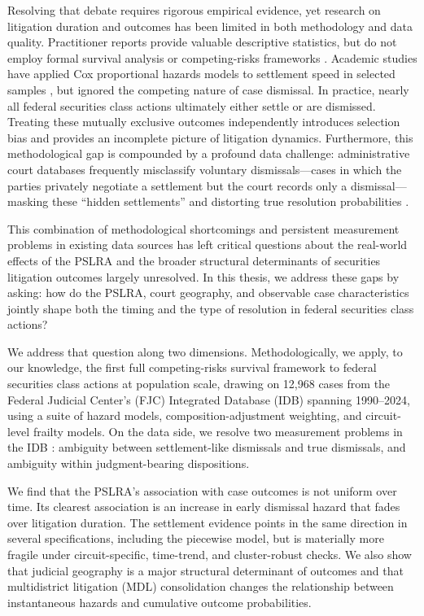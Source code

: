 Resolving that debate requires rigorous empirical evidence, yet
research on litigation duration and outcomes has been limited in
both methodology and data quality. Practitioner reports provide
valuable descriptive statistics, but do not employ formal survival
analysis or competing-risks frameworks \citep{cornerstone2024,
nera2024}. Academic studies have applied Cox proportional hazards
models to settlement speed in selected samples \citep{brochet2014},
but ignored the competing nature of case dismissal. In practice, nearly all federal securities class actions
ultimately either settle or are dismissed. Treating these mutually
exclusive outcomes independently introduces selection bias and
provides an incomplete picture of litigation dynamics. Furthermore,
this methodological gap is compounded by a profound data challenge:
administrative court databases frequently misclassify voluntary
dismissals---cases in which the parties privately negotiate a
settlement but the court records only a dismissal---masking these
``hidden settlements'' and distorting true resolution probabilities
\citep{scales2024}.

This combination of methodological shortcomings and persistent
measurement problems in existing data sources has left critical
questions about the real-world effects of the PSLRA and the broader
structural determinants of securities litigation outcomes largely
unresolved. In this thesis, we address these gaps by asking: how do
the PSLRA, court geography, and observable case characteristics jointly shape
both the timing and the type of resolution in federal securities
class actions?

We address that question along two dimensions. Methodologically, we apply,
to our knowledge, the first full competing-risks survival framework to
federal securities class actions at population scale, drawing on 12,968
cases from the Federal Judicial Center's (FJC) Integrated Database (IDB)
spanning 1990--2024, using a suite of hazard models, composition-adjustment
weighting, and circuit-level frailty models. On the data side, we resolve
two measurement problems in the IDB \citep{clermont2002, alexander1991}:
ambiguity between settlement-like dismissals and true dismissals, and
ambiguity within judgment-bearing dispositions.

We find that the PSLRA's association with case
outcomes is not uniform over time. Its clearest association is an
increase in early dismissal hazard that fades over litigation
duration. The settlement evidence points in the same direction in
several specifications, including the piecewise model, but is
materially more fragile under circuit-specific, time-trend, and
cluster-robust checks. We also show that judicial geography is a
major structural determinant of outcomes and that multidistrict
litigation (MDL) consolidation changes the relationship between
instantaneous hazards and cumulative outcome probabilities.

